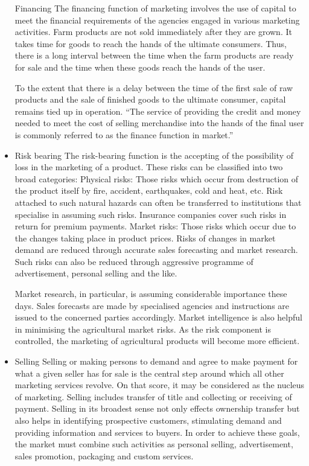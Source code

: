 \documentclass[11pt,]{book}
\theoremstyle{definition}
\theoremstyle{definition}
\theoremstyle{definition}
\theoremstyle{remark}
\begin{document}
\begin{itemize}
  Financing \newline The financing function of marketing involves the
  use of capital to meet the financial requirements of the agencies
  engaged in various marketing activities. Farm products are not sold
  immediately after they are grown. It takes time for goods to reach the
  hands of the ultimate consumers. Thus, there is a long interval
  between the time when the farm products are ready for sale and the
  time when these goods reach the hands of the user. \par
  To the extent that there is a delay between the time of the first sale
  of raw products and the sale of finished goods to the ultimate
  consumer, capital remains tied up in operation. ``The service of
  providing the credit and money needed to meet the cost of selling
  merchandise into the hands of the final user is commonly referred to
  as the finance function in market.''
\item
  Risk bearing \newline The risk-bearing function is the accepting of
  the possibility of loss in the marketing of a product. These risks can
  be classified into two broad categories: \newline  Physical risks:
  Those risks which occur from destruction of the product itself by
  fire, accident, earthquakes, cold and heat, etc. Risk attached to such
  natural hazards can often be transferred to institutions that
  specialise in assuming such risks. Insurance companies cover such
  risks in return for premium payments. \newline
  Market risks: Those risks which occur due to the changes taking place
  in product prices. Risks of changes in market demand are reduced
  through accurate sales forecasting and market research. Such risks can
  also be reduced through aggressive programme of advertisement,
  personal selling and the like. \par
  Market research, in particular, is assuming considerable importance
  these days. Sales forecasts are made by specialised agencies and
  instructions are issued to the concerned parties accordingly. Market
  intelligence is also helpful in minimising the agricultural market
  risks. As the risk component is controlled, the marketing of
  agricultural products will become more efficient.
\item
  Selling \newline Selling or making persons to demand and agree to make
  payment for what a given seller has for sale is the central step
  around which all other marketing services revolve. On that score, it
  may be considered as the nucleus of marketing. Selling includes
  transfer of title and collecting or receiving of payment. Selling in
  its broadest sense not only effects ownership transfer but also helps
  in identifying prospective customers, stimulating demand and providing
  information and services to buyers. In order to achieve these goals,
  the market must combine such activities as personal selling,
  advertisement, sales promotion, packaging and custom services.
\end{itemize}
\end{document}
